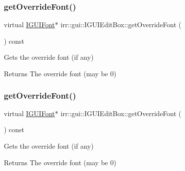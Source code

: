 \subsubsection{\texorpdfstring{get\+Override\+Font()}{getOverrideFont()}\hspace{0.1cm}{\footnotesize\ttfamily [1/2]}}
{\footnotesize\ttfamily virtual \hyperlink{classirr_1_1gui_1_1IGUIFont}{I\+G\+U\+I\+Font}$\ast$ irr\+::gui\+::\+I\+G\+U\+I\+Edit\+Box\+::get\+Override\+Font (\begin{DoxyParamCaption}{ }\end{DoxyParamCaption}) const\hspace{0.3cm}{\ttfamily [pure virtual]}}



Gets the override font (if any) 

\begin{DoxyReturn}{Returns}
The override font (may be 0) 
\end{DoxyReturn}
\mbox{\label{classirr_1_1gui_1_1IGUIEditBox_a4c5e6749a5ac390d6a10303babd845b8}} 
\subsubsection{\texorpdfstring{get\+Override\+Font()}{getOverrideFont()}\hspace{0.1cm}{\footnotesize\ttfamily [2/2]}}
{\footnotesize\ttfamily virtual \hyperlink{classirr_1_1gui_1_1IGUIFont}{I\+G\+U\+I\+Font}$\ast$ irr\+::gui\+::\+I\+G\+U\+I\+Edit\+Box\+::get\+Override\+Font (\begin{DoxyParamCaption}{ }\end{DoxyParamCaption}) const\hspace{0.3cm}{\ttfamily [pure virtual]}}



Gets the override font (if any) 

\begin{DoxyReturn}{Returns}
The override font (may be 0) 
\end{DoxyReturn}
\mbox{\label{classirr_1_1gui_1_1IGUIEditBox_ac993c4647168460c68d56527ba213b9c}} 
